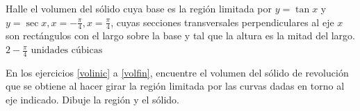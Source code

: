 \begin{ejer}{Halle el volumen del sólido cuya base es la región limitada por $%
	y=\tan x$ y $y=\sec x,x=-\frac{\pi }{4},x=\frac{\pi }{4}$, cuyas secciones
	transversales perpendiculares al eje $x$ son rectángulos con el largo
	sobre la base y tal que la altura es la mitad del largo.} {$2-\frac{\pi}{4} \text{ unidades cúbicas}$}
\end{ejer}



\begin{ejer}{En los ejercicios \eqref{volinic} a \eqref{volfin}, encuentre el volumen del sólido de revolución que se obtiene al hacer girar la región limitada por las curvas dadas en torno al eje indicado. Dibuje la región y el sólido.}
\end{ejer}



